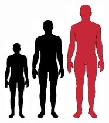 \documentclass[
  letterpaper,
  DIV=11,
  numbers=noendperiod]{scrartcl}
\theoremstyle{definition}
\theoremstyle{definition}
\theoremstyle{definition}
\theoremstyle{remark}
\begin{document}
\begin{figure}

\begin{minipage}{0.20\linewidth}

\includegraphics[width=0.1\textwidth,height=\textheight]{img/Human_Silhouette.svg.png}

\end{minipage}%
%
\begin{minipage}{0.20\linewidth}

\includegraphics[width=0.13\textwidth,height=\textheight]{img/Human_Silhouette.svg.png}

\end{minipage}%
%
\begin{minipage}{0.20\linewidth}

\includegraphics[width=0.15\textwidth,height=\textheight]{img/human-red.png}

\end{minipage}%
%
\begin{minipage}{0.20\linewidth}


\end{minipage}
\end{figure}
\end{document}
